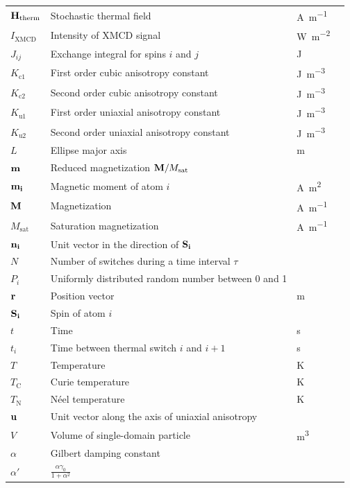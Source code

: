 \documentclass[11pt,a4paper,english,twoside]{article}
\begin{document}
\begin{longtable}{llll}
$\vb{H_\mathrm{therm}}$ & Stochastic thermal field & \si{\ampere\per\metre} \\
$I_\mathrm{XMCD}$ & Intensity of XMCD signal & \si{\watt\per\metre\squared} \\
$J_{ij}$ & Exchange integral for spins $i$ and $j$ & \si{\joule} \\
$K_\mathrm{c1}$ & First order cubic anisotropy constant & \si{\joule\per\metre\cubed} \\
$K_\mathrm{c2}$ & Second order cubic anisotropy constant & \si{\joule\per\metre\cubed} \\
$K_\mathrm{u1}$ & First order uniaxial anisotropy constant & \si{\joule\per\metre\cubed} \\
$K_\mathrm{u2}$ & Second order uniaxial anisotropy constant & \si{\joule\per\metre\cubed} \\
$L$ & Ellipse major axis & \si{\metre} \\
$\vb{m}$ & Reduced magnetization $\vb{M}/M_\mathrm{sat}$ &  \\
$\vb{m_i}$ & Magnetic moment of atom $i$ & \si{\ampere\metre\squared} \\
$\vb{M}$ & Magnetization & \si{\ampere\per\metre} \\
$M_\mathrm{sat}$ & Saturation magnetization & \si{\ampere\per\metre} \\
$\vb{n_i}$ & Unit vector in the direction of $\vb{S_i}$ &  \\
$N$ & Number of switches during a time interval $\tau$ &  \\
$P_i$ & Uniformly distributed random number between 0 and 1 &  \\
$\vb{r}$ & Position vector & \si{\metre} \\
$\vb{S_i}$ & Spin of atom $i$ &  \\
$t$ & Time & \si{\second} \\
$t_i$ & Time between thermal switch $i$ and $i+1$ & \si{\second} \\
$T$ & Temperature & \si{\kelvin} \\
$T_\mathrm{C}$ & Curie temperature & \si{\kelvin} \\
$T_\mathrm{N}$ & N\'{e}el temperature & \si{\kelvin} \\
$\vb{u}$ & Unit vector along the axis of uniaxial anisotropy &  \\
$V$ & Volume of single-domain particle & \si{\metre\cubed} \\
\midrule
$\alpha$ & Gilbert damping constant &  \\
$\alpha'$ & $\frac{\alpha \gamma_0}{1+\alpha^2}$ &  \\

\end{longtable}
\end{document}
